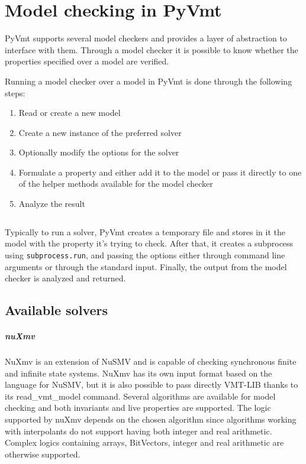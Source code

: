 \chapter{Model checking in PyVmt}
\label{ch:model-checking}
PyVmt supports several model checkers and provides a layer of abstraction to interface with them. Through a model checker it is possible to know whether the properties specified over a model are verified.

Running a model checker over a model in PyVmt is done through the following steps:
\begin{enumerate}
    \item Read or create a new model
    \item Create a new instance of the preferred solver
    \item Optionally modify the options for the solver
    \item Formulate a property and either add it to the model or pass it directly to one of the helper methods available for the model checker
    \item Analyze the result
\end{enumerate}

\inputminted[firstline=5, lastline=20]{python3}{py/model_checking.py}

Typically to run a solver, PyVmt creates a temporary file and stores in it the model with the property it's trying to check.
After that, it creates a subprocess using \texttt{subprocess.run}, and passing the options either through command line arguments or through the standard input.
Finally, the output from the model checker is analyzed and returned.

\section{Available solvers}

\paragraph*{nuXmv}
NuXmv is an extension of NuSMV and is capable of checking synchronous finite and infinite state systems. \cite{DBLP:conf/cav/CavadaCDGMMMRT14}
NuXmv has its own input format based on the language for NuSMV, but it is also possible to pass directly VMT-LIB thanks to its read\_vmt\_model command.
Several algorithms are available for model checking and both invariants and live properties are supported.
The logic supported by nuXmv depends on the chosen algorithm since algorithms working with interpolants do not support having both integer and real arithmetic. Complex logics containing arrays, BitVectors, integer and real arithmetic are otherwise supported.

